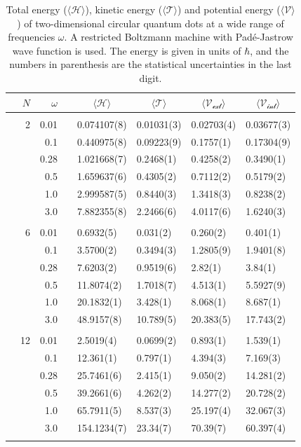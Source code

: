 \begin{table}
	\caption{Total energy ($\langle\mathcal{H}\rangle$), kinetic energy ($\langle\mathcal{T}\rangle$) and potential energy ($\langle\mathcal{V}\rangle$) of two-dimensional circular quantum dots at a wide range of frequencies $\omega$. A restricted Boltzmann machine with Padé-Jastrow wave function is used. The energy is given in units of $\hbar$, and the numbers in parenthesis are the statistical uncertainties in the last digit.}
	\label{tab:splitfrequencyQDRBMPJ}
	\begin{tabularx}{\textwidth}{R{1.5cm}rrcR{2.3cm}R{2.3cm}R{2.3cm}R{2.3cm}} \hline\hline
		& & $\omega$ &&  &  &  &  \\ \hline \\
		&2 & 0.01 && 0.074107(8) & 0.01031(3) & 0.02703(4) & 0.03677(3) \\
		&& 0.1 && 0.440975(8) & 0.09223(9) & 0.1757(1) & 0.17304(9) \\
		&& 0.28 && 1.021668(7) & 0.2468(1) & 0.4258(2) & 0.3490(1) \\
		&& 0.5 && 1.659637(6) & 0.4305(2) & 0.7112(2) & 0.5179(2)\\
		&& 1.0 && 2.999587(5) & 0.8440(3) & 1.3418(3) & 0.8238(2)\\
		&& 3.0 && 7.882355(8) & 2.2466(6) & 4.0117(6) & 1.6240(3) \\ \hdashline \\
		
		&6 & 0.01 && 0.6932(5) & 0.031(2) & 0.260(2) & 0.401(1) \\
		&& 0.1 && 3.5700(2) & 0.3494(3) & 1.2805(9) & 1.9401(8) \\
		&& 0.28 && 7.6203(2) & 0.9519(6) & 2.82(1) & 3.84(1) \\
		&& 0.5 && 11.8074(2) & 1.7018(7) & 4.513(1) & 5.5927(9) \\
		&& 1.0 && 20.1832(1) & 3.428(1) & 8.068(1) & 8.687(1) \\
		&& 3.0 && 48.9157(8) & 10.789(5) & 20.383(5) & 17.743(2) \\ \hdashline \\
		
		&12 & 0.01 && 2.5019(4) & 0.0699(2) & 0.893(1) & 1.539(1) \\
		&& 0.1 && 12.361(1) & 0.797(1) & 4.394(3) & 7.169(3) \\
		&& 0.28 && 25.7461(6) & 2.415(1) & 9.050(2) & 14.281(2) \\
		&& 0.5 && 39.2661(6) & 4.262(2) & 14.277(2) & 20.728(2) \\
		&& 1.0 && 65.7911(5) & 8.537(3) & 25.197(4) & 32.067(3) \\
		&& 3.0 && 154.1234(7) & 23.34(7) & 70.39(7) & 60.397(4) \\ \hdashline \\
		

\end{tabularx}
\end{table}
